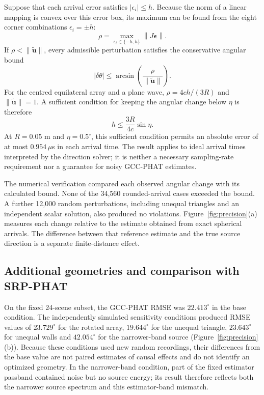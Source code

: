 \documentclass{edpsci}
\begin{document}
Suppose that each arrival error satisfies $|\epsilon_i|\leq h$. Because the norm of a linear mapping is convex over this error box, its maximum can be found from the eight corner combinations $\epsilon_i=\pm h$:
\begin{equation}
	\rho
	=
	\max_{\epsilon_i\in\{-h,h\}}
	\left\|J\boldsymbol\epsilon\right\|.
\end{equation}
If $\rho<\|\widetilde{\mathbf u}\|$, every admissible perturbation satisfies the conservative angular bound
\begin{equation}
	|\delta\theta|
	\leq
	\arcsin\!\left(
	\frac{\rho}{\|\widetilde{\mathbf u}\|}
	\right).
	\label{eq:bound}
\end{equation}
For the centred equilateral array and a plane wave, $\rho=4ch/(3R)$ and $\|\widetilde{\mathbf u}\|=1$. A sufficient condition for keeping the angular change below $\eta$ is therefore
\begin{equation}
	h
	\leq
	\frac{3R}{4c}\sin\eta.
\end{equation}
At $R=0.05$ m and $\eta=0.5^\circ$, this sufficient condition permits an absolute error of at most $0.954\,\mu$s in each arrival time. The result applies to ideal arrival times interpreted by the direction solver; it is neither a necessary sampling-rate requirement nor a guarantee for noisy GCC-PHAT estimates.

The numerical verification compared each observed angular change with its calculated bound. None of the 34,560 rounded-arrival cases exceeded the bound. A further 12,000 random perturbations, including unequal triangles and an independent scalar solution, also produced no violations. Figure~\ref{fig:precision}(a) measures each change relative to the estimate obtained from exact spherical arrivals. The difference between that reference estimate and the true source direction is a separate finite-distance effect.

\subsection{Additional geometries and comparison with SRP-PHAT}

On the fixed 24-scene subset, the GCC-PHAT RMSE was $22.413^\circ$ in the base condition. The independently simulated sensitivity conditions produced RMSE values of $23.729^\circ$ for the rotated array, $19.644^\circ$ for the unequal triangle, $23.643^\circ$ for unequal walls and $42.054^\circ$ for the narrower-band source (Figure~\ref{fig:precision}(b)). Because these conditions used new random recordings, their differences from the base value are not paired estimates of causal effects and do not identify an optimized geometry. In the narrower-band condition, part of the fixed estimator passband contained noise but no source energy; its result therefore reflects both the narrower source spectrum and this estimator-band mismatch.
\end{document}
